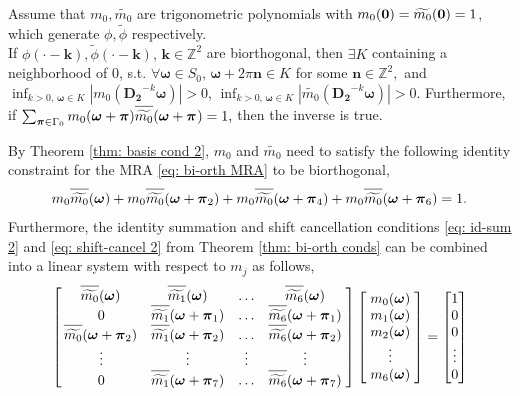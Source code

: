 \begin{thm}\label{thm: basis cond 2}
Assume that $m_0, \widetilde{m_0}$ are trigonometric polynomials with $m_0(\boldsymbol{0})=\widetilde{m_0}(\boldsymbol{0}) = 1$, which generate $\phi,\widetilde{\phi}$ respectively.\\
If $\phi(\cdot - \boldsymbol{k}),\widetilde{\phi}(\cdot - \boldsymbol{k}),\,\boldsymbol{k}\in\mathbb{Z}^2$ are biorthogonal, then $\exists K$ containing a neighborhood of 0, s.t. $\forall\boldsymbol{\omega}\in S_0,\,\boldsymbol{\omega}+2\pi\mathbf{n}\in K$ for some $\mathbf{n}\in\mathbb{Z}^2, $ and $\inf_{k>0,\,\boldsymbol{\omega}\in K}|m_0(\mathbf{D_2}^{-k}\boldsymbol{\omega})| >0$, $\inf_{k>0,\,\boldsymbol{\omega}\in K}|\widetilde{m_0}(\mathbf{D_2}^{-k}\boldsymbol{\omega})| >0$. 
 Furthermore, if  $\sum_{\boldsymbol{\V{\pi}}\in \Gamma_0} m_0(\boldsymbol{\omega}+\boldsymbol{\pi})\sbarmp{0}{} = 1,$ then the inverse is true.
\end{thm}
By Theorem \ref{thm: basis cond 2}, $m_0$ and $\widetilde{m_0}$ need to satisfy the following identity constraint for the MRA \eqref{eq: bi-orth MRA} to be biorthogonal,
\begin{align}\label{eq: identity-cond}
m_0\sbarm{0} + m_0\sbarmp{0}{2} + m_0\sbarmp{0}{4} + m_0\sbarmp{0}{6} = 1.
\end{align}
Furthermore, the identity summation and shift cancellation conditions \eqref{eq: id-sum 2} and \eqref{eq: shift-cancel 2} from Theorem \ref{thm: bi-orth conds}
 can be combined into a linear system with respect to $m_j$ as follows,
\begin{align}\label{eq: LS-new}
\begin{bmatrix}
    \,\sbarm{0} & \sbarm{1} & \hdots & \sbarm{6}\;  \\
    \;0 & \sbarmp{1}{1}  & \hdots  & \sbarmp{6}{1}\; \\
    \,\sbarmp{0}{2} & \sbarmp{1}{2} & \hdots & \sbarmp{6}{2}\;\\
    \;\vdots & \vdots & \vdots & \vdots \; \\
    \;0 & \sbarmp{1}{7} & \hdots & \sbarmp{6}{7}\;
\end{bmatrix}
\begin{bmatrix}
\;\mo{0}\; \\
\;\mo{1}\; \\
\;\mo{2}\; \\
\; \vdots\; \\
\;\mo{6}\; 
\end{bmatrix} 
=
\begin{bmatrix}
1\\
0\\
0\\
\vdots \\
0
\end{bmatrix}
\end{align}

